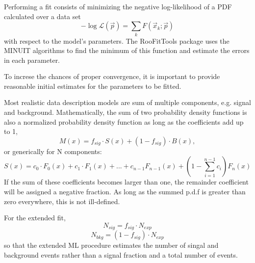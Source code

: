 
Performing a fit consists of minimizing the negative log-likelihood of a PDF calculated over a data set
%
\begin{equation}
-\log \mathcal{L} (\vec{p}) = \sum_k F(\vec{x}_k;\vec{p})
\end{equation}
%
with respect to the model's parameters.  The RooFitTools package uses the MINUIT\cite{MINUIT} algorithms to find the minimum of this function and estimate the errors in each parameter.  %


To increse the chances of proper convergence, it is important to provide reasonable initial estimates for the parameters to be fitted.


Most realistic data description models are sum of multiple components, e.g. signal and background. Mathematically, the sum of two probability density functions is  also a normalized probability density function as  long as the coefficients add up to 1, %
%
\begin{equation}
M(x) = f_{sig} \cdot S(x) + (1-f_{sig}) \cdot B(x),
\end{equation}
%
or generically for N components:
%
\begin{equation}
S(x) = c_0 \cdot F_0(x) + c_1 \cdot F_1(x)+...+c_{n-1}F_{n-1}(x)+ (1-\sum^{n-1}_{i=1}c_i) F_n(x)
\end{equation}
%
If the sum of these coefficients becomes larger than one, the remainder coefficient will be assigned a negative fraction. As long as the summed p.d.f is greater than zero everywhere, this is not ill-defined. %

For the extended fit, 
%
\begin{equation}
N_{sig} = f_{sig} \cdot N_{exp}
\end{equation}
%
\begin{equation}
N_{bkg} = (1-f_{sig}) \cdot N_{exp}
\end{equation}
%
so that the extended ML procedure estimates the number of singal and background events rather than a signal fraction and a total number of events.

